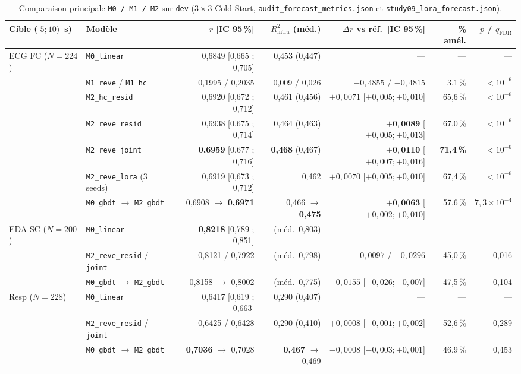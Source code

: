 \documentclass[10pt]{article}
\begin{document}
\begin{table}[t]
\centering\scriptsize\setlength{\tabcolsep}{4pt}
\begin{tabular}{@{}llrrrrr@{}}
\toprule
Cible ($[5 ; 10)$~s) & Modèle & $r$ [IC 95\,\%] & $R^2_{\text{intra}}$ (méd.) & $\Delta r$ vs réf.\ [IC 95\,\%] & \% amél. & $p$ / $q_{\text{FDR}}$\\
\midrule
ECG FC ($N=224$) & \texttt{M0\_linear} & 0,6849 [0,665 ; 0,705] & 0,453 (0,447) & — & — & —\\
 & \texttt{M1\_reve} / \texttt{M1\_hc} & 0,1995 / 0,2035 & 0,009 / 0,026 & $-0{,}4855$ / $-0{,}4815$ & 3,1\,\% & $<10^{-6}$\\
 & \texttt{M2\_hc\_resid} & 0,6920 [0,672 ; 0,712] & 0,461 (0,456) & $+0{,}0071$ [$+0{,}005 ; +0{,}010$] & 65,6\,\% & $<10^{-6}$\\
 & \texttt{M2\_reve\_resid} & 0,6938 [0,675 ; 0,714] & 0,464 (0,463) & $\mathbf{+0{,}0089}$ [$+0{,}005 ; +0{,}013$] & 67,0\,\% & $<10^{-6}$\\
 & \texttt{M2\_reve\_joint} & \textbf{0,6959} [0,677 ; 0,716] & \textbf{0,468} (0,467) & $\mathbf{+0{,}0110}$ [$+0{,}007 ; +0{,}016$] & \textbf{71,4\,\%} & $<10^{-6}$\\
 & \texttt{M2\_reve\_lora} (3 seeds) & 0,6919 [0,673 ; 0,712] & 0,462 & $+0{,}0070$ [$+0{,}005 ; +0{,}010$] & 67,4\,\% & $<10^{-6}$\\
 & \texttt{M0\_gbdt} $\to$ \texttt{M2\_gbdt} & 0,6908 $\to$ \textbf{0,6971} & 0,466 $\to$ \textbf{0,475} & $\mathbf{+0{,}0063}$ [$+0{,}002 ; +0{,}010$] & 57,6\,\% & $7{,}3\times 10^{-4}$\\
\midrule
EDA SC ($N=200$) & \texttt{M0\_linear} & \textbf{0,8218} [0,789 ; 0,851] & (méd.\ 0,803) & — & — & —\\
 & \texttt{M2\_reve\_resid} / \texttt{joint} & 0,8121 / 0,7922 & (méd.\ 0,798) & $-0{,}0097$ / $-0{,}0296$ & 45,0\,\% & 0,016\\
 & \texttt{M0\_gbdt} $\to$ \texttt{M2\_gbdt} & 0,8158 $\to$ 0,8002 & (méd.\ 0,775) & $-0{,}0155$ [$-0{,}026 ; -0{,}007$] & 47,5\,\% & 0,104\\
\midrule
Resp ($N=228$) & \texttt{M0\_linear} & 0,6417 [0,619 ; 0,663] & 0,290 (0,407) & — & — & —\\
 & \texttt{M2\_reve\_resid} / \texttt{joint} & 0,6425 / 0,6428 & 0,290 (0,410) & $+0{,}0008$ [$-0{,}001 ; +0{,}002$] & 52,6\,\% & 0,289\\
 & \texttt{M0\_gbdt} $\to$ \texttt{M2\_gbdt} & \textbf{0,7036} $\to$ 0,7028 & \textbf{0,467} $\to$ 0,469 & $-0{,}0008$ [$-0{,}003 ; +0{,}001$] & 46,9\,\% & 0,453\\
\bottomrule
\end{tabular}
\caption{Comparaison principale \texttt{M0 / M1 / M2} sur \texttt{dev} ($3\times 3$ Cold-Start, \texttt{audit\_forecast\_metrics.json} et \texttt{study09\_lora\_forecast.json}).}
\label{tab:forecast}
\end{table}
\end{document}
